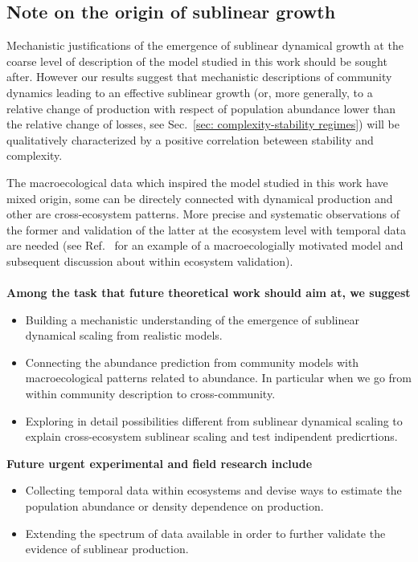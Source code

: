 \documentclass[10pt]{article}
\begin{document}
\subsection{Note on the origin of sublinear growth}

Mechanistic justifications of the emergence
of sublinear dynamical growth at the coarse level of description
of the model studied in this work should be
sought after. However our results suggest
that mechanistic descriptions of community dynamics 
leading to an effective sublinear growth 
(or, more generally, to a relative change 
of production with respect of population abundance
lower than the relative change of losses,
see Sec.~\ref{sec: complexity-stability regimes})
will be qualitatively characterized by a positive
correlation beteween stability and complexity.

The macroecological data which inspired the model studied in this work
have mixed origin, some can be directely connected with
dynamical production and other are cross-ecosystem patterns.
More precise and systematic observations of the former 
and validation of the latter at the ecosystem level
with temporal data are needed 
(see Ref.~\cite{Barbier2021} for an example of a macroecologially motivated
model and subsequent discussion about within ecosystem validation).
\\\\

\textbf{Among the task that future theoretical work should aim at, we suggest}
\begin{itemize}
    \item Building a mechanistic understanding of the emergence
          of sublinear dynamical scaling from realistic models.
    \item Connecting the abundance prediction from community
          models with macroecological patterns related to abundance.
          In particular when we go from within community description
          to cross-community.
    \item Exploring in detail possibilities different from 
          sublinear dynamical scaling to explain cross-ecosystem 
          sublinear scaling and test indipendent predicrtions.
\end{itemize}

\textbf{Future urgent experimental and field research include}
\begin{itemize}
    \item Collecting temporal data within ecosystems and devise ways 
          to estimate the population abundance or density dependence
          on production.
    \item Extending the spectrum of data available in order to 
          further validate the evidence of sublinear production.
\end{itemize} 
\end{document}
